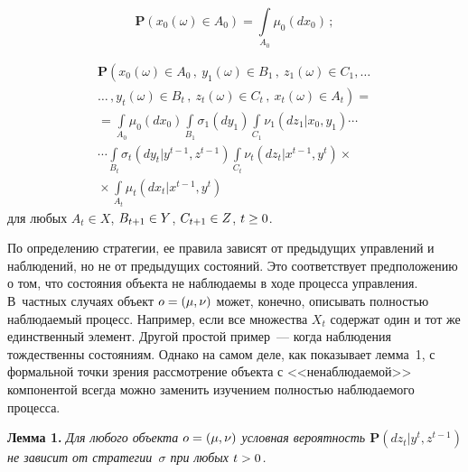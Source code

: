 \begin{multicols}{2}
\pagebreak

\noindent
$$
\mathbf{P}(x_0(\omega)\in A_0)=\int\limits_{A_0} \mu_0(dx_0)\,;
$$

\vspace*{-12pt}

\noindent
\begin{multline*}
\mathbf{P}\left(x_0(\omega)\in A_0\,,\  y_1(\omega)\in B_1\,,\ 
z_1(\omega)\in C_1, \ldots \right.\\[1pt]
\left.{}\ldots\,,
y_t(\omega)\in B_t\,,\  z_t(\omega)\in C_t\,,\  x_t(\omega)\in A_t\right)={}\\[1pt]
{}=\int\limits_{A_0}\mu_0(dx_0)\int\limits_{B_1}\sigma_1(dy_1)\int\limits_{C_1}\nu_1(dz_1
\vert x_0, y_1)\cdots{}\\[1pt]
{}\cdots
\int\limits_{B_t}\sigma_t\left(dy_t\vert y^{t-1},z^{t-1}\right) 
\int\limits_{C_t} \nu_t\left( dz_t\vert x^{t-
1},y^t\right) \times{}\\[1pt]
{}\times
\int\limits_{A_t} \mu_t\left( dx_t\vert x^{t-1},y^t\right)
\end{multline*}
для любых $A_t\in X$, $B_{t+1}\hm\in Y$, $C_{t+1}\hm\in Z$, $t\hm\geq 0$.
  
  По определению стратегии, ее правила зависят от предыдущих управлений и 
наблюдений, но не от предыдущих состояний. Это соответствует предположению о том, 
что состояния объекта не наблюдаемы в ходе процесса управления. В~частных случаях 
объект $o\hm=(\mu,\nu)$ может, конечно, описывать полностью наблюдаемый процесс. 
Например, если все множества $X_t$ содержат один и тот же единственный элемент. 
Другой простой пример~--- когда наблюдения тождественны состояниям. Однако на 
самом деле, как показывает лемма~1, с формальной точки зрения рассмотрение объекта с 
<<ненаблюдаемой>> компонентой всегда можно заменить изучением полностью 
наблюдаемого процесса.
  
  \medskip
  
  \noindent
  \textbf{Лемма 1.} \textit{Для любого объекта $o\hm=(\mu,\nu)$ условная вероятность 
$\mathbf{P}\left(dz_t\vert y^t,z^{t-1}\right)$ не зависит от стратегии~$\sigma$ при любых 
$t\hm>0$.}
  
  \medskip
  

\end{multicols}
